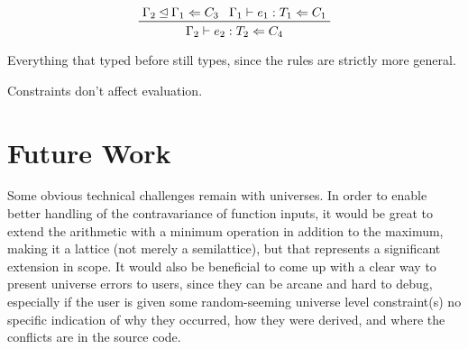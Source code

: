 \documentclass[11pt, twoside, reqno]{book}
\newcommand{\subsumedBy}{\unlhd}
\begin{document}
\begin{displaymath}
\prftree{\Gamma_2 \subsumedBy \Gamma_1 \Leftarrow C_3}{\Gamma_1 \vdash e_1 : T_1 \Leftarrow C_1}{\Gamma_2 \vdash e_2 : T_2 \Leftarrow C_4}
\end{displaymath}

Everything that typed before still types, since the rules are strictly more general.


Constraints don't affect evaluation.

\iffalse
\chapter{Putting Everything Together}
Coming back to surface syntax, it seems like universe polymorphism and row polymorphism can both be implicit.


Each usage of a polymorphic variable will have its polymorphic variables instantiated with fresh metavars, propagating the constraints.

Types can be syntactically omitted where they were previously required.
Also replaced with a metavariable syntax in other positions.
\fi


\chapter{Future Work}
Some obvious technical challenges remain with universes.
In order to enable better handling of the contravariance of function inputs, it would be great to extend the arithmetic with a minimum operation in addition to the maximum, making it a lattice (not merely a semilattice), but that represents a significant extension in scope.
It would also be beneficial to come up with a clear way to present universe errors to users, since they can be arcane and hard to debug, especially if the user is given some random-seeming universe level constraint(s) no specific indication of why they occurred, how they were derived, and where the conflicts are in the source code.
\end{document}
